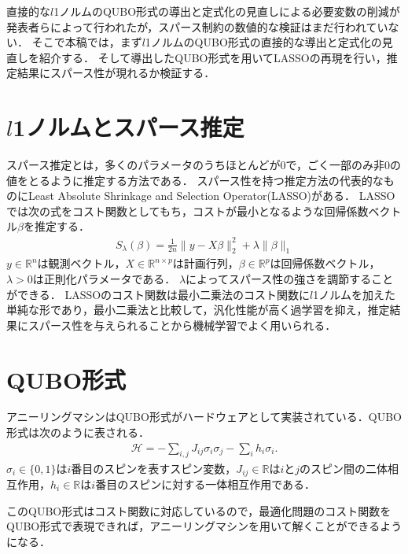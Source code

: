 \documentclass[technicalreport]{ieicej}
\begin{document}
直接的な$l$1ノルムのQUBO形式の導出と定式化の見直しによる必要変数の削減\cite{l1-norm}が発表者らによって行われたが，スパース制約の数値的な検証はまだ行われていない．
そこで本稿では，まず$l$1ノルムのQUBO形式の直接的な導出と定式化の見直しを紹介する．
そして導出したQUBO形式を用いてLASSOの再現を行い，推定結果にスパース性が現れるか検証する．

\section{$l$1ノルムとスパース推定}
スパース推定とは，多くのパラメータのうちほとんどが0で，ごく一部のみ非0の値をとるように推定する方法である．
スパース性を持つ推定方法の代表的なものにLeast Absolute Shrinkage and Selection Operator(LASSO)がある．
LASSOでは次の式をコスト関数としてもち，コストが最小となるような回帰係数ベクトル$\beta$を推定する．
\begin{eqnarray}
  S_{\lambda}(\beta)=\frac{1}{2n}\|y-X\beta\|^{2}_{2}+\lambda\|\beta\|_{1} \label{lasso_function}
\end{eqnarray}
$y\in\mathbb{R}^{n}$は観測ベクトル，$X\in\mathbb{R}^{n\times p}$は計画行列，$\beta\in\mathbb{R}^{p}$は回帰係数ベクトル，$\lambda >0$は正則化パラメータである．
$\lambda$によってスパース性の強さを調節することができる．
LASSOのコスト関数は最小二乗法のコスト関数に$l$1ノルムを加えた単純な形であり，最小二乗法と比較して，汎化性能が高く過学習を抑え，推定結果にスパース性を与えられることから機械学習でよく用いられる．

\section{QUBO形式}
アニーリングマシンはQUBO形式がハードウェアとして実装されている．QUBO形式は次のように表される．
\begin{eqnarray}
  \mathcal{H} = -\sum_{i,j}{J_{ij}\sigma_{i}\sigma_{j}}-\sum_{i}{h_{i}\sigma_{i}}. \label{QUBO_model}
\end{eqnarray}
$\sigma_{i}\in\{ 0,1\}$は$i$番目のスピンを表すスピン変数，$J_{ij}\in\mathbb{R}$は$i$と$j$のスピン間の二体相互作用，$h_{i}\in\mathbb{R}$は$i$番目のスピンに対する一体相互作用である．

このQUBO形式はコスト関数に対応しているので，最適化問題のコスト関数をQUBO形式で表現できれば，アニーリングマシンを用いて解くことができるようになる．
\end{document}
